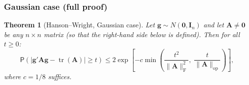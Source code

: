 \documentclass[14pt]{extarticle}
\theoremstyle{plain}
\newtheorem{theorem}{Theorem}[section]
\theoremstyle{definition}
\theoremstyle{remark}
\newcommand\prb{\mathsf{P}}
\DeclareMathOperator\tr{tr}
\newcommand{\bI}{\mathbf{I}}
\newcommand{\bzero}{\mathbf{0}}
\newcommand{\bA}{\mathbf{A}}
\newcommand{\bg}{\mathbf{g}}
\newcommand{\opnorm}[1]{\|#1\|_{\mathrm{op}}}
\newcommand{\fnorm}[1]{\|#1\|_{\mathrm{F}}}
\begin{document}
\subsubsection*{Gaussian case (full proof)}

\begin{theorem}[Hanson--Wright, Gaussian case]\label{thm:hanson-wright-gaussian}
Let $\bg \sim N(\bzero, \bI_n)$ and let $\bA \neq \bzero$ be any $n \times n$ matrix (so that the right-hand side below is defined). Then for all $t \geqslant 0$:
\begin{equation}\label{eq:hanson-wright-gaussian}
\prb\!\left(\left|\bg'\bA\bg - \tr(\bA)\right| \geqslant t\right) \leqslant 2\exp\!\left[-c\min\!\left(\frac{t^2}{\fnorm{\bA}^2},\; \frac{t}{\opnorm{\bA}}\right)\right],
\end{equation}
where $c = 1/8$ suffices.
\end{theorem}
\end{document}
